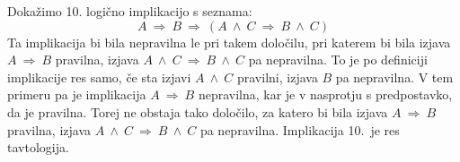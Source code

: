 \documentclass[11pt,paper=b5,DIV=13,headinclude,footinclude]{scrbook}
\newcounter{example}
\newcommand{\komentar}[1]{\textcolor{red}{[#1]}} %
\def\inn {{~\wedge~}}
\def\sledi {{~\Rightarrow~}}
\begin{document}
\pagebreak
\begin{example*}
Dokažimo 10. logično implikacijo s seznama:
$$A \sledi B \sledi (A\inn C \sledi B\inn C)$$
Ta implikacija bi bila nepravilna le pri takem določilu, pri katerem bi bila izjava
$A \sledi B$ pravilna, izjava $A\inn C \sledi B\inn C$ pa nepravilna. To je po definiciji implikacije res samo, če sta izjavi $A\inn C$ pravilni, izjava $B$ pa nepravilna.
V tem primeru pa je implikacija $A \sledi B$ nepravilna, kar je v nasprotju s predpostavko, da je
pravilna. Torej ne obstaja tako določilo, za katero bi bila izjava  $A \sledi B$ pravilna, izjava $A\inn C \sledi B\inn C$ pa nepravilna. Implikacija 10.~je res tavtologija.\end{example*}




















\end{document}
